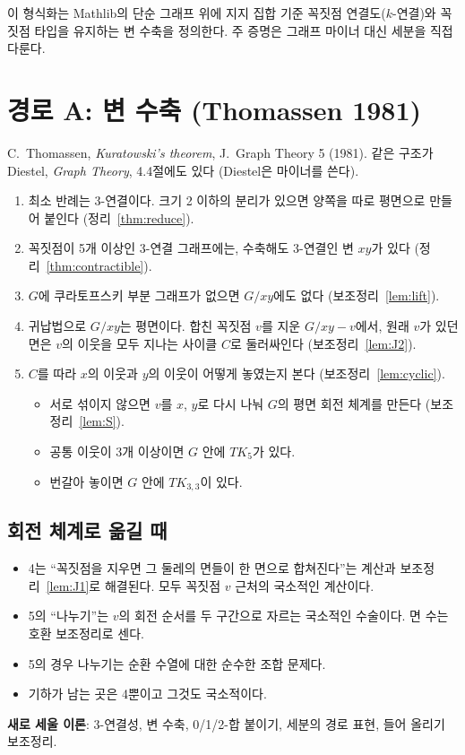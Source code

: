 이 형식화는 Mathlib의 단순 그래프 위에 지지 집합 기준 꼭짓점 연결도(\(k\)-연결)와
꼭짓점 타입을 유지하는 변 수축을 정의한다. 주 증명은 그래프 마이너 대신 세분을 직접 다룬다.

\section{경로 A: 변 수축 (Thomassen 1981)}

C.~Thomassen, \emph{Kuratowski's theorem}, J.~Graph Theory 5 (1981). 같은 구조가 Diestel,
\emph{Graph Theory}, 4.4절에도 있다 (Diestel은 마이너를 쓴다).
\begin{enumerate}
  \item 최소 반례는 3-연결이다. 크기 2 이하의 분리가 있으면 양쪽을 따로 평면으로 만들어 붙인다
        (정리~\ref{thm:reduce}).
  \item 꼭짓점이 5개 이상인 3-연결 그래프에는, 수축해도 3-연결인 변 \(xy\)가 있다
        (정리~\ref{thm:contractible}).
  \item \(G\)에 쿠라토프스키 부분 그래프가 없으면 \(G/xy\)에도 없다 (보조정리~\ref{lem:lift}).
  \item 귀납법으로 \(G/xy\)는 평면이다. 합친 꼭짓점 \(v\)를 지운 \(G/xy - v\)에서, 원래 \(v\)가 있던 면은
        \(v\)의 이웃을 모두 지나는 사이클 \(C\)로 둘러싸인다 (보조정리~\ref{lem:J2}).
  \item \(C\)를 따라 \(x\)의 이웃과 \(y\)의 이웃이 어떻게 놓였는지 본다 (보조정리~\ref{lem:cyclic}).
    \begin{itemize}
      \item 서로 섞이지 않으면 \(v\)를 \(x\), \(y\)로 다시 나눠 \(G\)의 평면 회전 체계를 만든다
            (보조정리~\ref{lem:S}).
      \item 공통 이웃이 3개 이상이면 \(G\) 안에 \(TK_5\)가 있다.
      \item 번갈아 놓이면 \(G\) 안에 \(TK_{3,3}\)이 있다.
    \end{itemize}
\end{enumerate}

\subsection*{회전 체계로 옮길 때}
\begin{itemize}
  \item 4는 ``꼭짓점을 지우면 그 둘레의 면들이 한 면으로 합쳐진다''는 계산과 보조정리~\ref{lem:J1}로
        해결된다. 모두 꼭짓점 \(v\) 근처의 국소적인 계산이다.
  \item 5의 ``나누기''는 \(v\)의 회전 순서를 두 구간으로 자르는 국소적인 수술이다. 면 수는 호환
        보조정리로 센다.
  \item 5의 경우 나누기는 순환 수열에 대한 순수한 조합 문제다.
  \item 기하가 남는 곳은 4뿐이고 그것도 국소적이다.
\end{itemize}
\textbf{새로 세울 이론}: 3-연결성, 변 수축, 0/1/2-합 붙이기, 세분의 경로 표현, 들어 올리기 보조정리.

